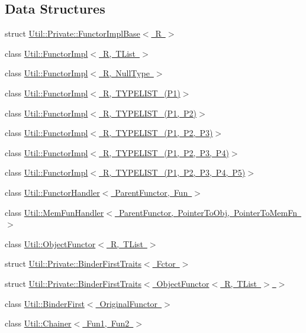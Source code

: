 \subsection*{Data Structures}
\begin{DoxyCompactItemize}
\item 
struct \mbox{\hyperlink{structUtil_1_1Private_1_1FunctorImplBase}{Util\+::\+Private\+::\+Functor\+Impl\+Base$<$ R $>$}}
\item 
class \mbox{\hyperlink{classUtil_1_1FunctorImpl}{Util\+::\+Functor\+Impl$<$ R, T\+List $>$}}
\item 
class \mbox{\hyperlink{classUtil_1_1FunctorImpl_3_01R_00_01NullType_01_4}{Util\+::\+Functor\+Impl$<$ R, Null\+Type $>$}}
\item 
class \mbox{\hyperlink{classUtil_1_1FunctorImpl_3_01R_00_01TYPELIST__1_07P1_08_4}{Util\+::\+Functor\+Impl$<$ R, T\+Y\+P\+E\+L\+I\+S\+T\+\_(\+P1)$>$}}
\item 
class \mbox{\hyperlink{classUtil_1_1FunctorImpl_3_01R_00_01TYPELIST__2_07P1_00_01P2_08_4}{Util\+::\+Functor\+Impl$<$ R, T\+Y\+P\+E\+L\+I\+S\+T\+\_(\+P1, P2)$>$}}
\item 
class \mbox{\hyperlink{classUtil_1_1FunctorImpl_3_01R_00_01TYPELIST__3_07P1_00_01P2_00_01P3_08_4}{Util\+::\+Functor\+Impl$<$ R, T\+Y\+P\+E\+L\+I\+S\+T\+\_(\+P1, P2, P3)$>$}}
\item 
class \mbox{\hyperlink{classUtil_1_1FunctorImpl_3_01R_00_01TYPELIST__4_07P1_00_01P2_00_01P3_00_01P4_08_4}{Util\+::\+Functor\+Impl$<$ R, T\+Y\+P\+E\+L\+I\+S\+T\+\_(\+P1, P2, P3, P4)$>$}}
\item 
class \mbox{\hyperlink{classUtil_1_1FunctorImpl_3_01R_00_01TYPELIST__5_07P1_00_01P2_00_01P3_00_01P4_00_01P5_08_4}{Util\+::\+Functor\+Impl$<$ R, T\+Y\+P\+E\+L\+I\+S\+T\+\_(\+P1, P2, P3, P4, P5)$>$}}
\item 
class \mbox{\hyperlink{classUtil_1_1FunctorHandler}{Util\+::\+Functor\+Handler$<$ Parent\+Functor, Fun $>$}}
\item 
class \mbox{\hyperlink{classUtil_1_1MemFunHandler}{Util\+::\+Mem\+Fun\+Handler$<$ Parent\+Functor, Pointer\+To\+Obj, Pointer\+To\+Mem\+Fn $>$}}
\item 
class \mbox{\hyperlink{classUtil_1_1ObjectFunctor}{Util\+::\+Object\+Functor$<$ R, T\+List $>$}}
\item 
struct \mbox{\hyperlink{structUtil_1_1Private_1_1BinderFirstTraits}{Util\+::\+Private\+::\+Binder\+First\+Traits$<$ Fctor $>$}}
\item 
struct \mbox{\hyperlink{structUtil_1_1Private_1_1BinderFirstTraits_3_01ObjectFunctor_3_01R_00_01TList_01_4_01_4}{Util\+::\+Private\+::\+Binder\+First\+Traits$<$ Object\+Functor$<$ R, T\+List $>$ $>$}}
\item 
class \mbox{\hyperlink{classUtil_1_1BinderFirst}{Util\+::\+Binder\+First$<$ Original\+Functor $>$}}
\item 
class \mbox{\hyperlink{classUtil_1_1Chainer}{Util\+::\+Chainer$<$ Fun1, Fun2 $>$}}
\end{DoxyCompactItemize}
